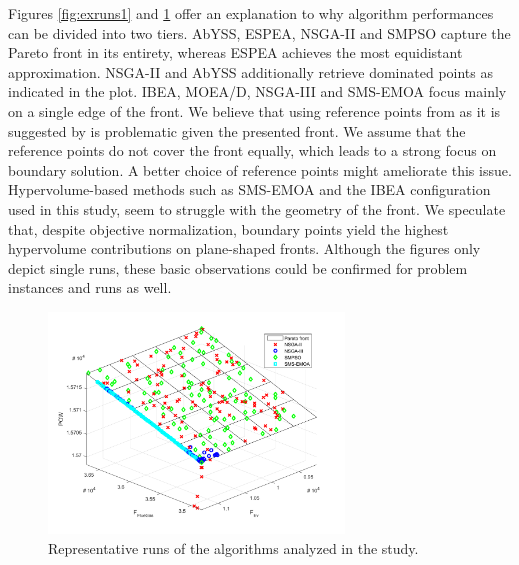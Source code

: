 Figures \ref{fig:exruns1} and \ref{fig:exruns2} offer an explanation to why algorithm performances can be divided into two tiers. AbYSS, ESPEA, NSGA-II and SMPSO capture the Pareto front in its entirety, whereas ESPEA achieves the most equidistant approximation. NSGA-II and AbYSS additionally retrieve dominated points as indicated in the plot. IBEA, MOEA/D, NSGA-III and SMS-EMOA focus mainly on a single edge of the front. We believe that using reference points from \cite{nbi} as it is suggested by \cite{moead2009,nsga3part1} is problematic given the presented front. We assume that the reference points do not cover the front equally, which leads to a strong focus on boundary solution. A better choice of reference points might ameliorate this issue. Hypervolume-based methods such as SMS-EMOA and the IBEA configuration used in this study, seem to struggle with the geometry of the front. We speculate that, despite objective normalization, boundary points yield the highest hypervolume contributions on plane-shaped fronts. Although the figures only depict single runs, these basic observations could be confirmed for problem instances and runs as well.

\begin{figure}
\centering
\includegraphics[width=0.7\textwidth]{figures/example2.pdf}
\caption{Representative runs of the algorithms analyzed in the study.}
\label{fig:exruns2}
\end{figure}

